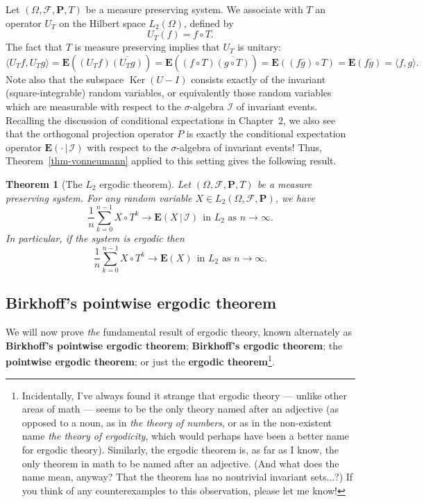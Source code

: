 \documentclass[12pt]{article}
\newtheorem{thm}{Theorem}[section]
\newcommand{\prob}{\mathbf{P}}
\newcommand{\expec}{\mathbf{E}}
\newcommand{\condexp}[2]{\expec\left(#1\,|\,#2\right)}
\theoremstyle{example}
\begin{document}
Let $(\Omega, \mathcal{F}, \prob, T)$ be a measure preserving system. We associate with $T$ an operator $U_T$ on the Hilbert space $L_2(\Omega)$, defined  by
$$ U_T(f) = f\circ T. $$
The fact that $T$ is measure preserving implies that $U_T$ is unitary:
$$ \langle U_T f, U_T g \rangle = \expec( (U_T f) \overline{(U_T g)} )
= \expec( (f\circ T) \overline{(g\circ T)} )
= \expec( (f\overline{g})\circ T ) = \expec( f\overline{g} ) = \langle f,g\rangle.
$$
Note also that the subspace $\operatorname{Ker}(U-I)$ consists exactly of the invariant (square-integrable) random variables, or equivalently those random variables which are measurable with respect to the $\sigma$-algebra $\mathcal{I}$ of invariant events. Recalling the discussion of conditional expectations in Chapter~2, we also see that the orthogonal projection operator $P$ is exactly the conditional expectation operator $\condexp{\cdot}{\mathcal{I}}$ with respect to the $\sigma$-algebra of invariant events! Thus, Theorem~\ref{thm-vonneumann} applied to this setting gives the following result.

\begin{thm}[The $L_2$ ergodic theorem]
Let $(\Omega, \mathcal{F}, \prob, T)$ be a measure preserving system. For any random variable $X\in L_2(\Omega, \mathcal{F}, \prob)$, we have
$$ \frac{1}{n} \sum_{k=0}^{n-1} X\circ T^{k} \to \condexp{X}{\mathcal{I}}\ \ \textrm{in $L_2$ as }n\to\infty. $$
In particular, if the system is ergodic then 
$$ \frac{1}{n} \sum_{k=0}^{n-1} X\circ T^{k} \to \expec(X)\ \ \textrm{in $L_2$ as }n\to\infty. $$
\end{thm}


\subsection{Birkhoff's pointwise ergodic theorem}

We will now prove \emph{the} fundamental result of ergodic theory, known alternately as  \textbf{Birkhoff's pointwise ergodic theorem}; \textbf{Birkhoff's ergodic theorem}; the \textbf{pointwise ergodic theorem}; or just the \textbf{ergodic theorem}\footnote{Incidentally, I've always found it strange that ergodic theory --- unlike other areas of math --- seems to be the only theory named after an adjective (as opposed to a noun, as in \emph{the theory of numbers}, or as in the non-existent name \emph{the theory of ergodicity}, which would perhaps have been a better name for ergodic theory). Similarly, the ergodic theorem is, as far as I know, the only theorem in math to be named after an adjective. (And what does the name mean, anyway? That the theorem has no nontrivial invariant sets...?) If you think of any counterexamples to this observation, please let me know!}.
\end{document}
